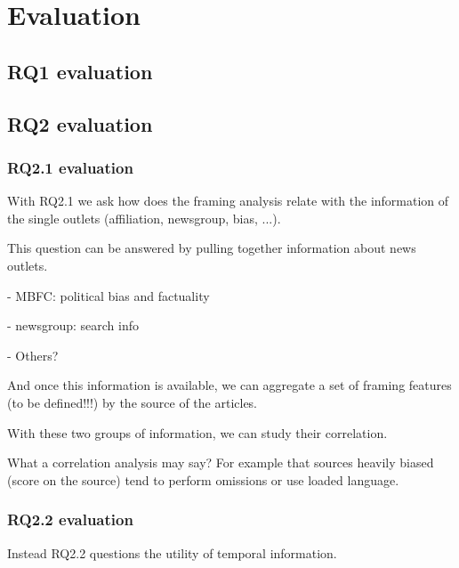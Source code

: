 \chapter{Evaluation}
\label{chap:evaluation}


\section{RQ1 evaluation}

\section{RQ2 evaluation}

\subsection{RQ2.1 evaluation}

With RQ2.1 we ask how does the framing analysis relate with the information of the single outlets (affiliation, newsgroup, bias, ...).

This question can be answered by pulling together information about news outlets.

- MBFC: political bias and factuality

- newsgroup: search info

- Others?

And once this information is available, we can aggregate a set of framing features (to be defined!!!) by the source of the articles.

With these two groups of information, we can study their correlation.

What a correlation analysis may say? For example that sources heavily biased (score on the source) tend to perform omissions or use loaded language.



\subsection{RQ2.2 evaluation}


Instead RQ2.2 questions the utility of temporal information. 
